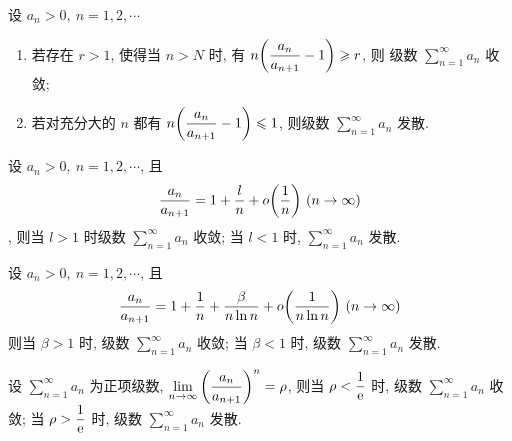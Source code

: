 \begin{theorem}
    设 $a_n>0,~n=1,2, \cdots $\begin{enumerate}[label=(\arabic{*})]
        \item 若存在 $r>1$, 使得当 $n>N$ 时, 有 $n\qty(\dfrac{a_n}{a_{n+1}}-1)\geqslant r$, 则 级数 $\displaystyle \sum_{n=1}^{\infty}a_n$ 收敛; 
        \item 若对充分大的 $n$ 都有 $n\qty(\dfrac{a_n}{a_{n+1}}-1)\leqslant 1$, 则级数 $\displaystyle \sum_{n=1}^{\infty}a_n$ 发散.
    \end{enumerate}
\end{theorem}

\begin{theorem}
    设 $a_n>0,~n=1,2, \cdots $, 且 $$\dfrac{a_n}{a_{n+1}}=1+\dfrac{l}{n}+o\qty(\dfrac{1}{n}) ~(n\to \infty)$$, 则当 $l>1$ 时级数 $\displaystyle \sum_{n=1}^{\infty} a_n$ 收敛; 当 $l<1$ 时, $\displaystyle \sum_{n=1}^{\infty} a_n$ 发散.
\end{theorem}

\begin{theorem}
    设 $a_n>0,~n=1,2, \cdots $, 且 $$
    \dfrac{a_n}{a_{n+1}}=1+\dfrac{1}{n}+\dfrac{\beta}{n\ln n}+o\qty(\dfrac{1}{n\ln n})~(n\to \infty)
    $$
    则当 $\beta>1$ 时, 级数 $\displaystyle \sum_{n=1}^{\infty} a_n$ 收敛; 当 $\beta<1$ 时, 级数 $\displaystyle \sum_{n=1}^{\infty} a_n$ 发散.
\end{theorem}

\begin{theorem}
    设 $\displaystyle \sum_{n=1}^{\infty} a_n$ 为正项级数, $\displaystyle \lim_{n \to \infty}\qty(\dfrac{a_n}{a_{n+1}})^{n}=\rho$,
    则当 $\rho<\dfrac{1}{\mathrm{e}}$ 时, 级数 $\displaystyle \sum_{n=1}^{\infty} a_n$ 收敛; 当 $\rho>\dfrac{1}{\mathrm{e}}$ 时, 级数 $\displaystyle \sum_{n=1}^{\infty} a_n$ 发散.
\end{theorem}

